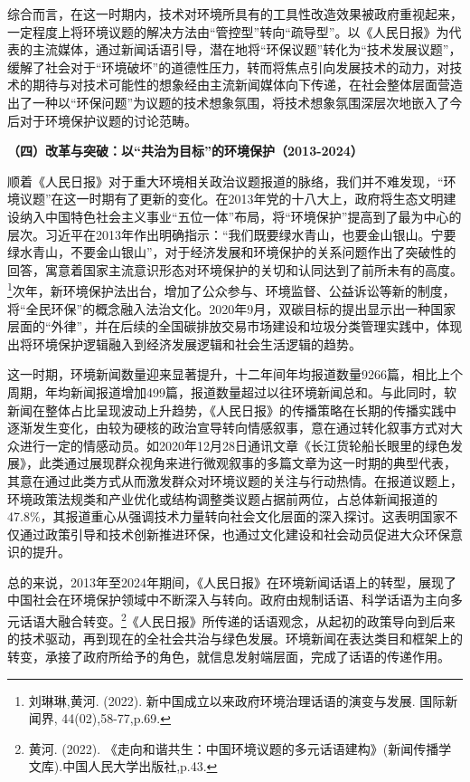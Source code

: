 综合而言，在这一时期内，技术对环境所具有的工具性改造效果被政府重视起来，一定程度上将环境议题的解决方法由``管控型''转向``疏导型''。以《人民日报》为代表的主流媒体，通过新闻话语引导，潜在地将``环保议题''转化为``技术发展议题''，缓解了社会对于``环境破坏''的道德性压力，转而将焦点引向发展技术的动力，对技术的期待与对技术可能性的想象经由主流新闻媒体向下传递，在社会整体层面营造出了一种以``环保问题''为议题的技术想象氛围，将技术想象氛围深层次地嵌入了今后对于环境保护议题的讨论范畴。

\textbf{（四）改革与突破：以``共治为目标''的环境保护（2013-2024）}

顺着《人民日报》对于重大环境相关政治议题报道的脉络，我们并不难发现，``环境议题''在这一时期有了更新的变化。在2013年党的十八大上，政府将生态文明建设纳入中国特色社会主义事业``五位一体''布局，将``环境保护''提高到了最为中心的层次。习近平在2013年作出明确指示：``我们既要绿水青山，也要金山银山。宁要绿水青山，不要金山银山''，对于经济发展和环境保护的关系问题作出了突破性的回答，寓意着国家主流意识形态对环境保护的关切和认同达到了前所未有的高度。\footnote{刘琳琳,黄河.
  (2022). 新中国成立以来政府环境治理话语的演变与发展. 国际新闻界,
  44(02),58-77,p.69.}次年，新环境保护法出台，增加了公众参与、环境监督、公益诉讼等新的制度，将``全民环保''的概念融入法治文化。2020年9月，双碳目标的提出显示出一种国家层面的``外律''，并在后续的全国碳排放交易市场建设和垃圾分类管理实践中，体现出将环境保护逻辑融入到经济发展逻辑和社会生活逻辑的趋势。

这一时期，环境新闻数量迎来显著提升，十二年间年均报道数量9266篇，相比上个周期，年均新闻报道增加499篇，报道数量超过以往环境新闻总和。与此同时，软新闻在整体占比呈现波动上升趋势，《人民日报》的传播策略在长期的传播实践中逐渐发生变化，由较为硬核的政治宣导转向情感叙事，意在通过转化叙事方式对大众进行一定的情感动员。如2020年12月28日通讯文章《长江货轮船长眼里的绿色发展》，此类通过展现群众视角来进行微观叙事的多篇文章为这一时期的典型代表，其意在通过此类方式从而激发群众对环境议题的关注与行动热情。在报道议题上，环境政策法规类和产业优化或结构调整类议题占据前两位，占总体新闻报道的47.8\%，其报道重心从强调技术力量转向社会文化层面的深入探讨。这表明国家不仅通过政策引导和技术创新推进环保，也通过文化建设和社会动员促进大众环保意识的提升。

总的来说，2013年至2024年期间，《人民日报》在环境新闻话语上的转型，展现了中国社会在环境保护领域中不断深入与转向。政府由规制话语、科学话语为主向多元话语大融合转变。\footnote{黄河.
  (2022).
  《走向和谐共生：中国环境议题的多元话语建构》(新闻传播学文库).中国人民大学出版社,p.43.}《人民日报》所传递的话语观念，从起初的政策导向到后来的技术驱动，再到现在的全社会共治与绿色发展。环境新闻在表达类目和框架上的转变，承接了政府所给予的角色，就信息发射端层面，完成了话语的传递作用。

